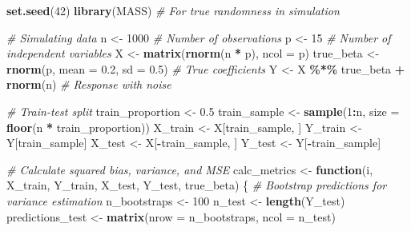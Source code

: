 \documentclass[
]{article}
\newenvironment{Shaded}{\begin{snugshade}}{\end{snugshade}}
\newcommand{\AttributeTok}[1]{\textcolor[rgb]{0.13,0.29,0.53}{#1}}
\newcommand{\CommentTok}[1]{\textcolor[rgb]{0.56,0.35,0.01}{\textit{#1}}}
\newcommand{\ControlFlowTok}[1]{\textcolor[rgb]{0.13,0.29,0.53}{\textbf{#1}}}
\newcommand{\DecValTok}[1]{\textcolor[rgb]{0.00,0.00,0.81}{#1}}
\newcommand{\FloatTok}[1]{\textcolor[rgb]{0.00,0.00,0.81}{#1}}
\newcommand{\FunctionTok}[1]{\textcolor[rgb]{0.13,0.29,0.53}{\textbf{#1}}}
\newcommand{\NormalTok}[1]{#1}
\newcommand{\OtherTok}[1]{\textcolor[rgb]{0.56,0.35,0.01}{#1}}
\newcommand{\SpecialCharTok}[1]{\textcolor[rgb]{0.81,0.36,0.00}{\textbf{#1}}}
\begin{document}
\begin{Shaded}
\begin{Highlighting}[]
\FunctionTok{set.seed}\NormalTok{(}\DecValTok{42}\NormalTok{)}
\FunctionTok{library}\NormalTok{(MASS) }\CommentTok{\# For true randomness in simulation}

\CommentTok{\# Simulating data}
\NormalTok{n }\OtherTok{\textless{}{-}} \DecValTok{1000} \CommentTok{\# Number of observations}
\NormalTok{p }\OtherTok{\textless{}{-}} \DecValTok{15} \CommentTok{\# Number of independent variables}
\NormalTok{X }\OtherTok{\textless{}{-}} \FunctionTok{matrix}\NormalTok{(}\FunctionTok{rnorm}\NormalTok{(n }\SpecialCharTok{*}\NormalTok{ p), }\AttributeTok{ncol =}\NormalTok{ p)}
\NormalTok{true\_beta }\OtherTok{\textless{}{-}} \FunctionTok{rnorm}\NormalTok{(p, }\AttributeTok{mean =} \FloatTok{0.2}\NormalTok{, }\AttributeTok{sd =} \FloatTok{0.5}\NormalTok{) }\CommentTok{\# True coefficients}
\NormalTok{Y }\OtherTok{\textless{}{-}}\NormalTok{ X }\SpecialCharTok{\%*\%}\NormalTok{ true\_beta }\SpecialCharTok{+} \FunctionTok{rnorm}\NormalTok{(n) }\CommentTok{\# Response with noise}

\CommentTok{\# Train{-}test split}
\NormalTok{train\_proportion }\OtherTok{\textless{}{-}} \FloatTok{0.5}
\NormalTok{train\_sample }\OtherTok{\textless{}{-}} \FunctionTok{sample}\NormalTok{(}\DecValTok{1}\SpecialCharTok{:}\NormalTok{n, }\AttributeTok{size =} \FunctionTok{floor}\NormalTok{(n }\SpecialCharTok{*}\NormalTok{ train\_proportion))}
\NormalTok{X\_train }\OtherTok{\textless{}{-}}\NormalTok{ X[train\_sample, ]}
\NormalTok{Y\_train }\OtherTok{\textless{}{-}}\NormalTok{ Y[train\_sample]}
\NormalTok{X\_test }\OtherTok{\textless{}{-}}\NormalTok{ X[}\SpecialCharTok{{-}}\NormalTok{train\_sample, ]}
\NormalTok{Y\_test }\OtherTok{\textless{}{-}}\NormalTok{ Y[}\SpecialCharTok{{-}}\NormalTok{train\_sample]}

\CommentTok{\# Calculate squared bias, variance, and MSE}
\NormalTok{calc\_metrics }\OtherTok{\textless{}{-}} \ControlFlowTok{function}\NormalTok{(i, X\_train, Y\_train, X\_test, Y\_test, true\_beta) \{}
  \CommentTok{\# Bootstrap predictions for variance estimation}
\NormalTok{  n\_bootstraps }\OtherTok{\textless{}{-}} \DecValTok{100}
\NormalTok{  n\_test }\OtherTok{\textless{}{-}} \FunctionTok{length}\NormalTok{(Y\_test)}
\NormalTok{  predictions\_test }\OtherTok{\textless{}{-}} \FunctionTok{matrix}\NormalTok{(}\AttributeTok{nrow =}\NormalTok{ n\_bootstraps, }\AttributeTok{ncol =}\NormalTok{ n\_test)}
  

\end{Highlighting}
\end{Shaded}
\end{document}
